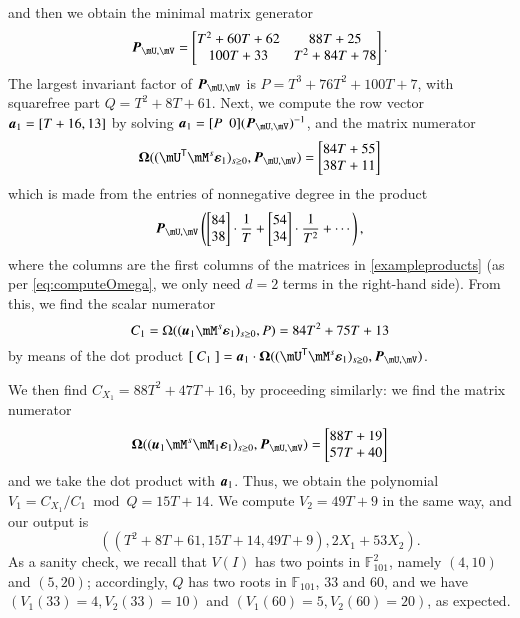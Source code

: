 \documentclass[final,1p,times,authoryear]{elsarticle}
\newcommand{\mat}[1]{\bm{\MakeUppercase{#1}}} %
\newcommand{\row}[1]{\bm{\MakeLowercase{#1}}} %
\newcommand{\col}[1]{\bm{\MakeLowercase{#1}}} %
\newcommand{\minpoly}{P}
\newcommand{\sqfree}{Q}
\newcommand{\trsp}[1]{#1^{\mathsf{T}}} %
\def\F {\ensuremath{\mathbb{F}}}
\newcommand{\mUt}{\trsp{\mU}}
\begin{document}
and then we obtain the minimal matrix generator
\[
  \mat{P}_{\mU,\mV} =
  \begin{bmatrix}
    T^2 + 60T + 62 &       88T + 25\\
    100T + 33 & T^2 + 84T + 78
  \end{bmatrix}.
\]
The largest invariant factor of $\mat{P}_{\mU,\mV}$ is 
$P = T^3 + 76T^2 + 100T + 7$,
with squarefree part $\sqfree=T^2+8T+61$.
Next, we compute the row vector $\row{a}_1 = [T+16,13]$ 
by solving $\row{a}_1 = [P~~0] (\mat{P}_{\mU,\mV})^{-1}$,
and the matrix numerator
\[
  \mat{\Omega}( (\mUt \mM^s\col{\varepsilon}_1)_{s \ge 0}, \mat{P}_{\mU,\mV}) 
  =\left [\begin{matrix} 84T + 55 \\ 38T + 11 \end{matrix}\right ]
\]
which is made from the entries of nonnegative degree in the product
\[\mat{P}_{\mU,\mV} 
  \left (
    \begin{bmatrix}
      84\\  
      38
    \end{bmatrix}\cdot \frac 1T+
    \begin{bmatrix}
      54\\  
      34
    \end{bmatrix}\cdot \frac 1{T^2}+
  \cdots \right),
\]
where the columns are the first columns of the
matrices in \cref{exampleproducts} (as per \cref{eq:computeOmega}, we only need $d=2$
terms in the right-hand side).  From this, we find the scalar
numerator 
\[
  C_1 = \Omega((\row{u}_1 \mM^s\col{\varepsilon}_1)_{s \ge
  0}, \minpoly) = 84T^2 + 75T + 13
\]
by means of the dot product $[~C_1~] = \row{a}_1\cdot
\mat{\Omega}( (\mUt \mM^s\col{\varepsilon}_1)_{s \ge 0},
\mat{P}_{\mU,\mV})$.

We then find $C_{X_1} = 88T^2 + 47T  + 16$, by proceeding similarly: we find
the matrix numerator
\[
  \mat{\Omega}( (\row{u}_1 \mM^s \mM_1\col{\varepsilon}_1)_{s \ge 0},
  \mat{P}_{\mU,\mV}) = \begin{bmatrix} 88T + 19 \\ 57T+40
  \end{bmatrix}
\]
and we take the dot product with $\row{a}_1$.
Thus, we obtain the polynomial $V_1 = C_{X_1}/C_1 \bmod \sqfree =
15T+14$. 
We compute $V_2= 49T+9$ in the same way,
and our output is 
$$((T^2+8T+61, 15T+14, 49T+9), 2X_1 + 53 X_2).$$ As a sanity check, we
recall that $V( I)$ has two points in $\F_{101}^2$, namely
$(4,10)$ and $(5,20)$; accordingly, $Q$ has two roots in $\F_{101}$,
$33$ and $60$, and we have $(V_1(33) = 4, V_2(33) = 10)$ and $(V_1(60) = 5,
V_2(60) = 20)$, as expected.
\end{document}
